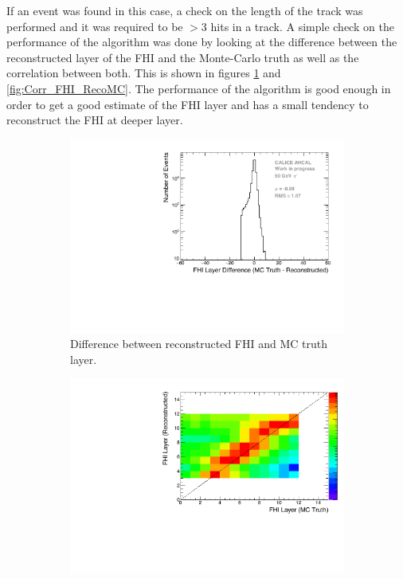 If an event was found in this case, a check on the length of the track was performed and it was required to be $>3$ hits in a track. A simple check on the performance of the algorithm was done by looking at the difference between the reconstructed layer of the FHI and the Monte-Carlo truth as well as the correlation between both. This is shown in figures \ref{fig:Diff_FHI_RecoMC} and \ref{fig:Corr_FHI_RecoMC}. The performance of the algorithm is good enough in order to get a good estimate of the FHI layer and has a small tendency to reconstruct the FHI at deeper layer.

\begin{figure}[htbp!]
	\begin{subfigure}[t]{0.5\textwidth}
		\centering
		\includegraphics[width=1\textwidth]{chap5/fig_AHCAL_timing/Pions/ShowerStart_Difference_noOptimisation.pdf}
		\caption{Difference between reconstructed FHI and MC truth layer.}\label{fig:Diff_FHI_RecoMC}
	\end{subfigure}
	\hfill
	\begin{subfigure}[t]{0.5\textwidth}
		\centering
		\includegraphics[width=1\textwidth]{chap5/fig_AHCAL_timing/Pions/ShowerStart_Difference_noOptimisation_2D.pdf}

\end{subfigure}
\end{figure}
